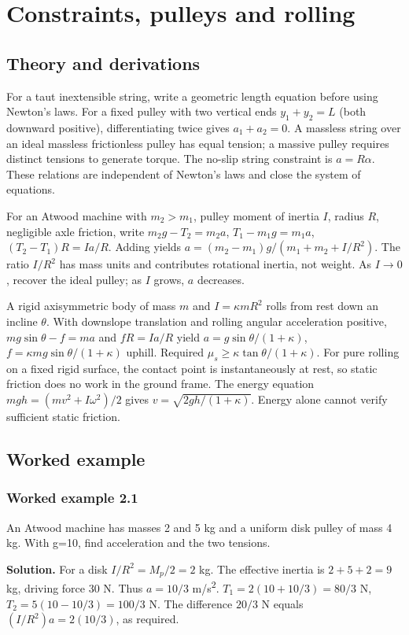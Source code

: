 \documentclass[11pt,a4paper,openany]{book}
\begin{document}
\chapter{Constraints, pulleys and rolling}
\section{Theory and derivations}
For a taut inextensible string, write a geometric length equation before using Newton's laws. For a fixed pulley with two vertical ends $y_1+y_2=L$ (both downward positive), differentiating twice gives $a_1+a_2=0$. A massless string over an ideal massless frictionless pulley has equal tension; a massive pulley requires distinct tensions to generate torque. The no-slip string constraint is $a=R\alpha$. These relations are independent of Newton's laws and close the system of equations.

For an Atwood machine with $m_2>m_1$, pulley moment of inertia $I$, radius $R$, negligible axle friction, write $m_2g-T_2=m_2a$, $T_1-m_1g=m_1a$, $(T_2-T_1)R=I a/R$. Adding yields $a=(m_2-m_1)g/(m_1+m_2+I/R^2)$. The ratio $I/R^2$ has mass units and contributes rotational inertia, not weight. As $I\to0$, recover the ideal pulley; as $I$ grows, $a$ decreases.

A rigid axisymmetric body of mass $m$ and $I=\kappa mR^2$ rolls from rest down an incline $\theta$. With downslope translation and rolling angular acceleration positive, $mg\sin\theta-f=ma$ and $fR=I a/R$ yield $a=g\sin\theta/(1+\kappa)$, $f=\kappa mg\sin\theta/(1+\kappa)$ uphill. Required $\mu_s\ge\kappa\tan\theta/(1+\kappa)$. For pure rolling on a fixed rigid surface, the contact point is instantaneously at rest, so static friction does no work in the ground frame. The energy equation $mgh=(mv^2+I\omega^2)/2$ gives $v=\sqrt{2gh/(1+\kappa)}$. Energy alone cannot verify sufficient static friction.

\section{Worked example}
\subsection*{Worked example 2.1}
An Atwood machine has masses 2 and 5 kg and a uniform disk pulley of mass 4 kg. With g=10, find acceleration and the two tensions.

\textbf{Solution.} For a disk $I/R^2=M_p/2=2$ kg. The effective inertia is $2+5+2=9$ kg, driving force 30 N. Thus $a=10/3$ m/s\textsuperscript{2}. $T_1=2(10+10/3)=80/3$ N, $T_2=5(10-10/3)=100/3$ N. The difference $20/3$ N equals $(I/R^2)a=2(10/3)$, as required.
\end{document}
